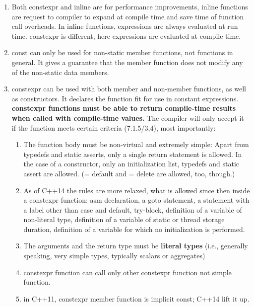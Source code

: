 \documentclass[a4paper,12pt,twoside]{book}
\begin{document}
\begin{itemize}
     \begin{enumerate}
         \item Both constexpr and inline are for performance improvements, inline functions are request to compiler to expand at compile time and save time of function call overheads. In inline functions, expressions are always evaluated at run time. constexpr is different, here expressions are evaluated at compile time.
         
         \item const can only be used for non-static member functions, not functions in general. It gives a guarantee that the member function does not modify any of the non-static data members.

         
         \item constexpr can be used with both member and non-member functions, as well as constructors. It declares the function fit for use in constant expressions. \textbf{constexpr functions must be able to return compile-time results when called with compile-time values.} The compiler will only accept it if the function meets certain criteria (7.1.5/3,4), most importantly: 
         \begin{enumerate}
             \item The function body must be non-virtual and extremely simple: Apart from typedefs and static asserts, only a single return statement is allowed. In the case of a constructor, only an initialization list, typedefs and static assert are allowed. (= default and = delete are allowed, too, though.)
             
             \item As of C++14 the rules are more relaxed, what is allowed since then inside a constexpr function: asm declaration, a goto statement, a statement with a label other than case and default, try-block, definition of a variable of non-literal type, definition of a variable of static or thread storage duration, definition of a variable for which no initialization is performed.
             
             \item The arguments and the return type must be \textbf{literal types} (i.e., generally speaking, very simple types, typically scalars or aggregates)
             
             \item constexpr function can call only other constexpr function not simple function.
             
             \item in C++11, constexpr member function is implicit const; C++14 lift it up.
         \end{enumerate}
     \end{enumerate}


\end{itemize}
\end{document}

